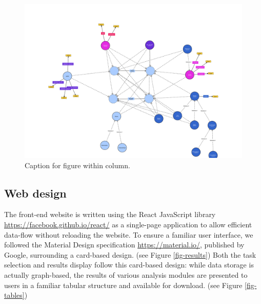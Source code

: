 \documentclass[a4,center,fleqn]{NAR}
\begin{document}
\begin{figure}[t]
\begin{center}
\includegraphics{images/spfy_ontology-1.svg}
\end{center}
\caption{Caption for figure within column.}
\label{fig-ontology}
\end{figure}

\subsection{Web design}

The front-end website is written using the React JavaScript library \url{https://facebook.github.io/react/} as a single-page application to allow efficient data-flow without reloading the website.
To ensure a familiar user interface, we followed the Material Design specification \url{https://material.io/}, published by Google, surrounding a card-based design.
(see Figure \ref{fig-results})
Both the task selection and results display follow this card-based design: while data storage is actually graph-based, the results of various analysis modules are presented to users in a familiar tabular structure and available for download.
(see Figure \ref{fig-tables})
\end{document}

